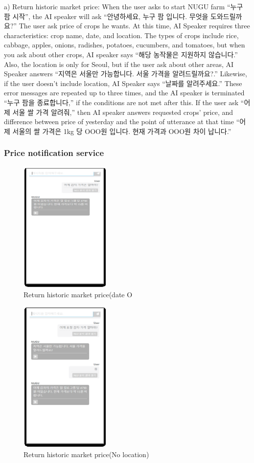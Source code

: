 \documentclass[conference]{IEEEtran}
\begin{document}
a) Return historic market price:
When the user asks to start NUGU farm “누구 팜 시작”, the AI speaker will ask “안녕하세요, 누구 팜 입니다. 무엇을 도와드릴까요?” The user ask price of crops he wants. At this time, AI Speaker requires three characteristics: crop name, date, and location. The types of crops include rice, cabbage, apples, onions, radishes, potatoes, cucumbers, and tomatoes, but when you ask about other crops, AI speaker says “해당 농작물은 지원하지 않습니다.” Also, the location is only for Seoul, but if the user ask about other areas, AI Speaker answers “지역은 서울만 가능합니다. 서울 가격을 알려드릴까요?.” Likewise, if the user doesn’t include location, AI Speaker says “날짜를 알려주세요.” These error messages are repeated up to three times, and the AI speaker is terminated “누구 팜을 종료합니다,” if the conditions are not met after this. If the user ask “어제 서울 쌀 가격 알려줘,” then AI speaker answers requested crops’ price, and difference between price of yesterday and the point of utterance at that time “어제 서울의 쌀 가격은 1kg 당 OOO원 입니다. 현재 가격과 OOO원 차이 납니다.”

\subsubsection{Price notification service\\}
\begin{figure}[h]
\centering
    \includegraphics[width =4.5cm]{1-2.eps}
    \hfil
\caption{Return historic market price(date O\\}
\end{figure}

\begin{figure}[h]
\centering
    \includegraphics[width =4.5cm]{1-3.eps}
    \hfil
\caption{Return historic market price(No location)}
\end{figure}
\newpage
\end{document}
